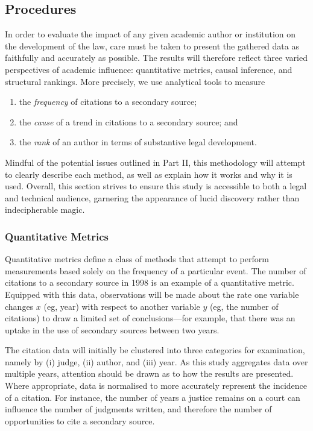 
\let\xn\xnote
\subsection{Procedures}

In order to evaluate the impact of any given academic author or institution on the development of the law, care must be taken to present the gathered data as faithfully and accurately as possible.\xn{3b-0} The results will therefore reflect three varied perspectives of academic influence: quantitative metrics, causal inference, and structural rankings. More precisely, we use analytical tools to measure
\begin{enumerate}
    \item the \emph{frequency} of citations to a secondary source;
    \item the \emph{cause} of a trend in citations to a secondary source; and
    \item the \emph{rank} of an author in terms of substantive legal development.
\end{enumerate}
Mindful of the potential issues outlined in Part II, this methodology will attempt to clearly describe each method, as well as explain how it works and why it is used. Overall, this section strives to ensure this study is accessible to both a legal and technical audience, garnering the appearance of lucid discovery rather than indecipherable magic.

\subsubsection{Quantitative Metrics}
Quantitative metrics define a class of methods that attempt to perform measurements based solely on the frequency of a particular event.\xn{3b-4} The number of citations to a secondary source in 1998 is an example of a quantitative metric. Equipped with this data, observations will be made about the rate one variable changes $x$ (eg, year) with respect to another variable $y$ (eg, the number of citations) to draw a limited set of conclusions\xn{3b-5}---for example, that there was an uptake in the use of secondary sources between two years.

The citation data will initially be clustered into three categories for examination, namely by (i) judge, (ii) author, and (iii) year. As this study aggregates data over multiple years, attention should be drawn as to how the results are presented. Where appropriate, data is normalised to more accurately represent the incidence of a citation. For instance, the number of years a justice remains on a court can influence the number of judgments written, and therefore the number of opportunities to cite a secondary source.

